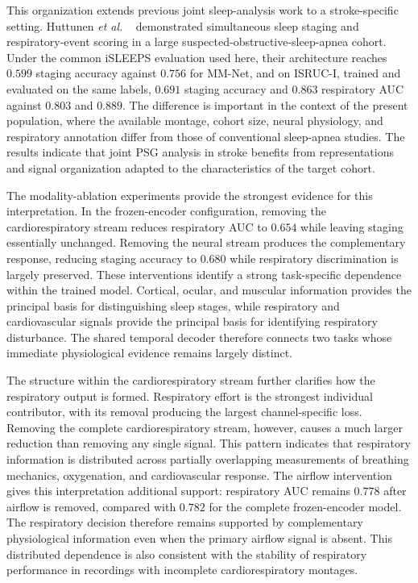 \documentclass{ieeeaccess}
\newcommand{\mmAccS}{0.756}
\begin{document}
This organization extends previous joint sleep-analysis work to a
stroke-specific setting. Huttunen \emph{et al.}
~\cite{huttunen2023simultaneous} demonstrated simultaneous sleep staging and
respiratory-event scoring in a large suspected-obstructive-sleep-apnea cohort.
Under the common iSLEEPS evaluation used here, their architecture reaches
$0.599$ staging accuracy against $\mmAccS$ for MM-Net, and on ISRUC-I, trained and evaluated on
the same labels, $0.691$ staging accuracy and $0.863$ respiratory AUC against $0.803$ and $0.889$. The difference is important in the context of the present
population, where the available montage, cohort size, neural physiology, and
respiratory annotation differ from those of conventional sleep-apnea studies.
The results indicate that joint PSG analysis in stroke benefits from
representations and signal organization adapted to the characteristics of the
target cohort.

The modality-ablation experiments provide the strongest evidence for this
interpretation. In the frozen-encoder configuration, removing the cardiorespiratory stream
reduces respiratory AUC to $0.654$ while leaving staging essentially unchanged. Removing the neural
stream produces the complementary response, reducing staging accuracy to
$0.680$ while respiratory discrimination is largely preserved. These
interventions identify a strong task-specific dependence within the trained
model. Cortical, ocular, and muscular information provides the principal basis
for distinguishing sleep stages, while respiratory and cardiovascular signals
provide the principal basis for identifying respiratory disturbance. The
shared temporal decoder therefore connects two tasks whose immediate
physiological evidence remains largely distinct.

The structure within the cardiorespiratory stream further clarifies how the
respiratory output is formed. Respiratory effort is the strongest individual
contributor, with its removal producing the largest channel-specific loss.
Removing the complete cardiorespiratory stream, however, causes a much larger
reduction than removing any single signal. This pattern indicates that
respiratory information is distributed across partially overlapping
measurements of breathing mechanics, oxygenation, and cardiovascular response.
The airflow intervention gives this interpretation additional support:
respiratory AUC remains $0.778$ after airflow is removed, compared with $0.782$
for the complete frozen-encoder model. The respiratory decision therefore remains supported by
complementary physiological information even when the primary airflow signal is
absent. This distributed dependence is also consistent with the stability of
respiratory performance in recordings with incomplete cardiorespiratory
montages.
\end{document}
